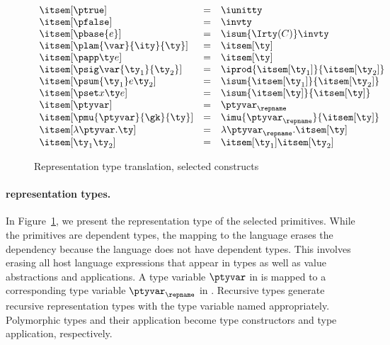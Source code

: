 \begin{figure}
\fbox{$\itsem[\ty] = \ity$}
\[
\begin{array}{lcl} 
\itsem[\ptrue] & = & \iunitty \\
\itsem[\pfalse] & = & \invty \\
\itsem[\pbase{e}] & = & \isum {\Irty(C)} \invty   \\
\itsem[\plam{\var}{\ity}{\ty}] & = & \itsem[\ty] \\
\itsem[\papp \ty e] & = & \itsem[\ty] \\
\itsem[\psig \var {\ty_1} {\ty_2}]  & = & \iprod {\itsem[\ty_1]} {\itsem[\ty_2]}    \\
\itsem[\psum {\ty_1} e {\ty_2}]     & = & \isum {\itsem[\ty_1]} {\itsem[\ty_2]} \\
\itsem[\pset x \ty e] & = & \isum {\itsem[\ty]}{\itsem[\ty]}\\
\itsem[\ptyvar] & = & \ptyvar_\repname \\
\itsem[\pmu{\ptyvar}{\gk}{\ty}] & = & \imu{\ptyvar_\repname}{\itsem[\ty]} \\
\itsem[\lambda \ptyvar.\ty]       & = & \lambda \ptyvar_\repname.\itsem[\ty] \\
\itsem[\ty_1 \ty_2]              & = & \itsem[\ty_1] \itsem[\ty_2] \\
\end{array}
\]
\caption{Representation type translation, selected constructs}
\label{fig:rep-tys}
\end{figure}


\paragraph*{\ddc{} representation types.}
\label{sec:intty-sem}
In Figure~\ref{fig:rep-tys}, we present the representation type
of the selected \ddc{} primitives. While the primitives are
dependent types, the mapping to the \implang{} language 
erases the dependency because the \implang{} language 
does not have dependent types. This involves erasing all host language
expressions that appear in types as well as 
value abstractions and applications.
A type variable $\ptyvar$ in \ddc{} is mapped to a corresponding
type variable $\ptyvar_\repname$ in \fomega{}.
Recursive types generate recursive representation types with the type
variable named appropriately. Polymorphic types and their application 
become \fomega{} type constructors and type application, respectively.

